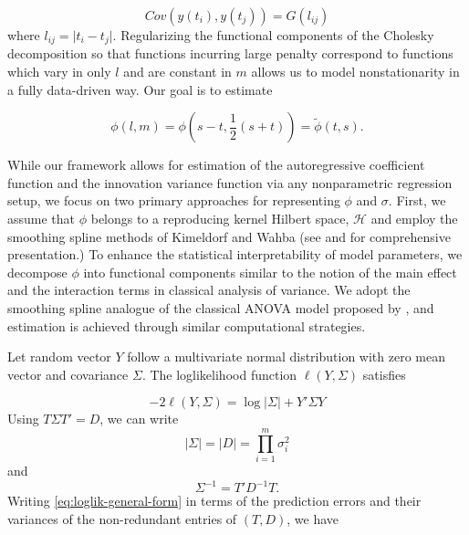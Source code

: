 \begin{equation*}
Cov\left(y\left( t_i \right),y\left( t_j \right)\right) = G\left( l_{ij}  \right)
\end{equation*}
\noindent
where $l_{ij} =  \vert  t_i - t_j  \vert $. Regularizing the functional components of the Cholesky decomposition so that functions incurring large penalty correspond to functions which vary in only $l$ and are constant in $m$ allows us to model nonstationarity in a fully data-driven way.  Our goal is to estimate

\begin{equation} 
\phi\left(l,m\right) = \phi\left(s-t, \frac{1}{2}\left(s+t\right)\right) = \tilde{\phi}\left(t,s\right).
\end{equation}

\bigskip

While our framework allows for estimation of the autoregressive coefficient function and the innovation variance function via any nonparametric regression setup, we focus on two primary approaches for representing $\phi$ and $\sigma$. First, we assume that $\phi$ belongs to a reproducing kernel Hilbert space, $\mathcal{H}$ and employ the smoothing spline methods of Kimeldorf and Wahba (see \cite{kimeldorf1971some} and \cite{wahba1990spline} for comprehensive presentation.)  To enhance the statistical interpretability of model parameters, we decompose $\phi$ into functional components similar to the notion of the main effect and the interaction terms in classical analysis of variance. We adopt the smoothing spline analogue of the classical ANOVA model proposed by \cite{gu2013smoothing}, and estimation is achieved through similar computational strategies.

\bigskip

Let random vector $Y$ follow a multivariate normal distribution with zero mean vector and covariance $\Sigma$. The loglikelihood function $\ell \left( Y, \Sigma \right)$ satisfies

\begin{equation} \label{eq:loglik-general-form}
-2\ell\left( Y, \Sigma \right) = \log \vert \Sigma \vert + Y' \Sigma Y
\end{equation}
\noindent
Using $T \Sigma T' = D$, we can write 
\[
\vert \Sigma\vert = \vert D \vert = \prod_{i = 1}^m \sigma_i^2
\]
and 
\[
\Sigma^{-1} = T' D^{-1} T.
\]
Writing \ref{eq:loglik-general-form} in terms of the prediction errors and their variances of the non-redundant entries of $\left(T , D\right)$, we have

